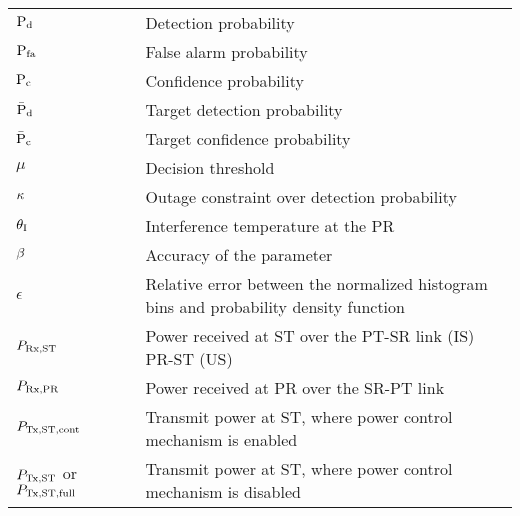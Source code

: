 \begin{longtable}{p{}p{}p{}}
       $\text{P}_{\text{d}}$                   & &             Detection probability \\ 
       $\text{P}_{\text{fa}}$                  & &             False alarm probability \\ 
       $\text{P}_{\text{c}}$                  & &             Confidence probability \\ 
       $\bar{\text{P}}_{\text{d}}$                  & &             Target detection probability \\ 
       $\bar{\text{P}}_{\text{c}}$                 & &             Target confidence probability \\ 
       $\mu$                   & &             Decision threshold \\ 
       $\kappa$                  & &             Outage constraint over detection probability \\ 
       $\theta_{\text{I}}$                  & &             Interference temperature at the PR \\ 
       $\beta$	               & &             Accuracy of the parameter \\	
       $\epsilon$	       & &             Relative error between the normalized histogram bins and probability density function  \\	



	$P_{\text{Rx,ST}}$  		& &		Power received at ST over the PT-SR link (IS) PR-ST (US) \\ 
	$P_{\text{Rx,PR}}$  		& &		Power received at PR over the SR-PT link \\

	$P_{\text{Tx,ST,cont}}$	  		& &  	Transmit power at ST, where power control mechanism is enabled	\\
	$P_{\text{Tx,ST}}$ or $P_{\text{Tx,ST,full}}$ 	& &  	Transmit power at ST, where power control mechanism is disabled	\\
	

\end{longtable}
